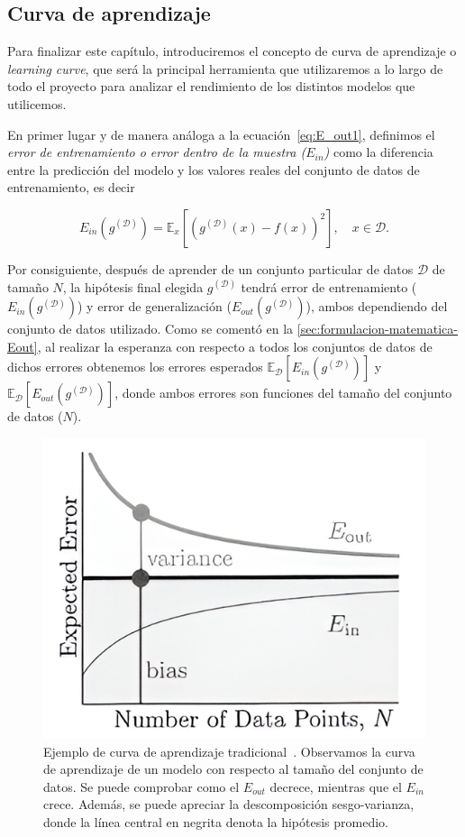 \subsection{Curva de aprendizaje}

Para finalizar este capítulo, introduciremos el concepto de curva de aprendizaje o \emph{learning curve}, que será la principal herramienta que utilizaremos a lo largo de todo el proyecto para analizar el rendimiento de los distintos modelos que utilicemos.\newline

En primer lugar y de manera análoga a la ecuación~\eqref{eq:E_out1}, definimos el \emph{error de entrenamiento o error dentro de la muestra ($E_{in}$)} como la diferencia entre la predicción del modelo y los valores reales del conjunto de datos de entrenamiento, es decir

\begin{equation}\label{eq:E_in1}
    E_{in}(g^{\mathcal{(D)}}) = \mathbb{E}_{x}[{(g^{\mathcal{(D)}}(x) - f(x))}^2], \quad x \in \mathcal{D}.
\end{equation}\newline

Por consiguiente, después de aprender de un conjunto particular de datos $\mathcal{D}$ de tamaño $N$, la hipótesis final elegida $g^{(\mathcal{D})}$ tendrá error de entrenamiento ($E_{in}(g^{(\mathcal{D})})$) y error de generalización ($E_{out}(g^{(\mathcal{D})})$), ambos dependiendo del conjunto de datos utilizado. Como se comentó en la \autoref{sec:formulacion-matematica-Eout}, al realizar la esperanza con respecto a todos los conjuntos de datos de dichos errores obtenemos los errores esperados $\mathbb{E}_{\mathcal{D}}[E_{in}(g^{(\mathcal{D})})]$ y $\mathbb{E}_{\mathcal{D}}[E_{out}(g^{(\mathcal{D})})]$, donde ambos errores son funciones del tamaño del conjunto de datos ($N$).\newline

\begin{figure}[h]
    \centering
    \includegraphics[width=0.4\linewidth]{img/learning-curve.png}
    \caption[Ejemplo de curva de aprendizaje tradicional~\cite{Mostafa2012}.] {Ejemplo de curva de aprendizaje tradicional~\cite{Mostafa2012}. Observamos la curva de aprendizaje de un modelo con respecto al tamaño del conjunto de datos. Se puede comprobar como el $E_{out}$ decrece, mientras que el $E_{in}$ crece. Además, se puede apreciar la descomposición sesgo-varianza, donde la línea central en negrita denota la hipótesis promedio.}\label{fig:learning-curve-bias-variance}
\end{figure}

